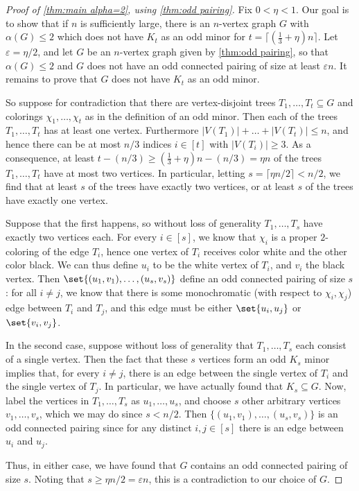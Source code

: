 \documentclass[11pt,reqno,oneside]{amsart}
\theoremstyle{definition}
\newcommand\ab[1]{\lvert#1\rvert}
\newcommand\1{\mathbf{1}}
\newcommand{\eps}{\varepsilon}
\let\leq\leqslant
\let\geq\geqslant
\begin{document}
\begin{proof}[Proof of \cref{thm:main alpha=2}, using \cref{thm:odd pairing}]
	Fix $0<\eta<1$. Our goal is to show that if $n$ is sufficiently large, there is an $n$-vertex graph $G$ with $\alpha(G)\leq 2$ which does not have $K_t$ as an odd minor for $t=\lceil (\frac13+\eta)n\rceil$. Let $\eps= \eta/2$, and let $G$ be an $n$-vertex graph given by \cref{thm:odd pairing}, so that $\alpha(G)\leq 2$ and $G$ does not have an odd connected pairing of size at least $\eps n$. 
    It remains to prove that $G$ does not have $K_t$ as an odd minor.

	So suppose for contradiction that there are vertex-disjoint trees $T_{1},\dots,T_t\subseteq G$ and colorings $\chi_{1},\dots,\chi_t$ as in the definition of an odd minor. Then each of the trees  $T_{1},\dots,T_t$ has at least one vertex. Furthermore $\ab{V(T_1)}+\dots+\ab{V(T_t)}\leq n$, and hence there can be at most $n/3$ indices $i \in [t]$ with $\ab{V(T_i)}\geq 3$. As a consequence, at least $t-(n/3)\geq (\frac13+\eta)n-(n/3)=\eta n$ of the trees $T_{1},\dots,T_t$ have at most two vertices. In particular, letting $s=\lceil \eta n/2\rceil<n/2$, we find that at least $s$ of the trees have exactly two vertices, or at least $s$ of the trees have exactly one vertex.

	Suppose that the first happens, so without loss of generality $T_1,\dots,T_s$ have exactly two vertices each. For every $i \in [s]$, we know that $\chi_i$ is a proper $2$-coloring of the edge $T_i$, hence one vertex of $T_i$ receives color white and the other color black. We can thus define $u_i$ to be the white vertex of $T_i$, and $v_i$ the black vertex. Then $\set{(u_1,v_1),\dots,(u_s,v_s)}$ define an odd connected pairing of size $s$: for all $i\neq j$, we know that there is some monochromatic (with respect to $\chi_i,\chi_j$) edge between $T_i$ and $T_j$, and this edge must be either $\set{u_i, u_j}$ or $\set{v_i, v_j}$.

	In the second case, suppose without loss of generality that $T_1,\dots,T_s$ each consist of a single vertex. Then the fact that these $s$ vertices form an odd $K_s$ minor implies that, for every $i \neq j$, there is an edge between the single vertex of $T_i$ and the single vertex of $T_j$. In particular, we have actually found that $K_s \subseteq G$. Now, label the vertices in $T_1,\dots,T_s$ as $u_1,\dots,u_{s}$, and choose $s$ other arbitrary vertices $v_1,\dots,v_s$, which we may do since $s<n/2$. Then $\{(u_1,v_1),\dots,(u_s,v_s)\}$ is an odd connected pairing since for any distinct $i,j\in [s]$ there is an edge between $u_i$ and $u_j$.

	Thus, in either case, we have found that $G$ contains an odd connected pairing of size $s$. Noting that $s\geq \eta n/2=\eps n$, this is a contradiction to our choice of $G$.
\end{proof}
\end{document}
